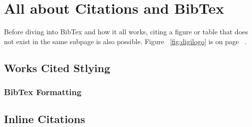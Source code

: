 \documentclass[./dissertation.tex]{subfiles}
\begin{document}
    \chapter{All about Citations and BibTex}
    Before diving into BibTex and how it all works, citing a figure or table that does not exist in the same subpage is also possible. Figure ~\ref{fig:digilogo} is on page ~\pageref{fig:digilogo}.
    \section{Works Cited Stlying}
      \subsection{BibTex Formatting}
        \parencite{article1}
        \parencite{article2}
    \section{Inline Citations}
\end{document}
